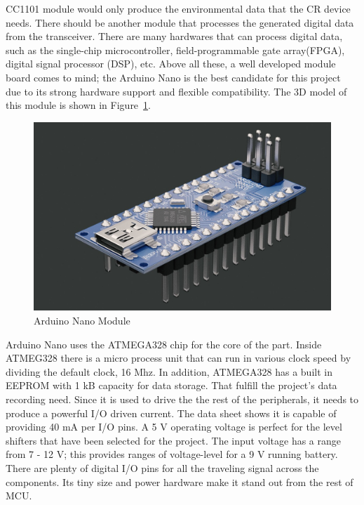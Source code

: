 CC1101 module would only produce the environmental data that the CR device needs. There should be another module that processes the generated digital data from the transceiver. There are many hardwares that can process digital data, such as the single-chip microcontroller, field-programmable gate array(FPGA), digital signal processor (DSP), etc. Above all these, a well developed module board comes to mind; the Arduino Nano is the best candidate for this project due to its strong hardware support and flexible compatibility. The 3D model of this module is shown in Figure~\ref{fig:arduino_nano}. 

\begin{figure}[ht]
\centering
\includegraphics[width=12cm]{figures/arduino_nano.jpg}
\caption{Arduino Nano Module}
\label{fig:arduino_nano}
\end{figure}

Arduino Nano uses the ATMEGA328 chip for the core of the part. Inside ATMEG328 there is a micro process unit that can run in various clock speed by dividing the default clock, 16 Mhz. In addition, ATMEGA328 has a built in EEPROM with 1 kB capacity for data storage. That fulfill the project's data recording need. Since it is used to drive the the rest of the peripherals, it needs to produce a powerful I/O driven current. The data sheet shows it is capable of providing 40 mA per I/O pins. A 5 V operating voltage is perfect for the level shifters that have been selected for the project. The input voltage has a range from 7 - 12 V; this provides ranges of voltage-level for a 9 V running battery. There are plenty of digital I/O pins for all the traveling signal across the components. Its tiny size and power hardware make it stand out from the rest of MCU.


